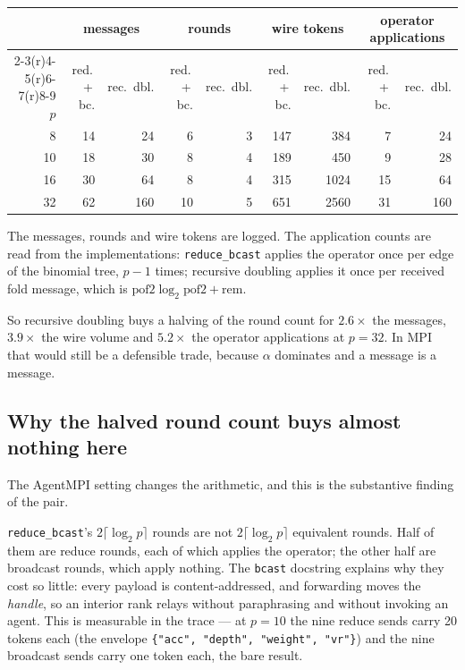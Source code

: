\documentclass[11pt]{article}
\begin{document}
\begin{center}\footnotesize
\begin{tabular}{@{}rrrrrrrrr@{}}
\toprule
  & \multicolumn{2}{c}{messages} & \multicolumn{2}{c}{rounds} & \multicolumn{2}{c}{wire tokens} & \multicolumn{2}{c}{operator applications} \\
  \cmidrule(r){2-3}\cmidrule(r){4-5}\cmidrule(r){6-7}\cmidrule(r){8-9}
  $p$ & red.\,+\,bc. & rec.\ dbl. & red.\,+\,bc. & rec.\ dbl. & red.\,+\,bc. & rec.\ dbl. & red.\,+\,bc. & rec.\ dbl. \\
\midrule
  8  & 14 & 24  & 6  & 3 & 147 & 384  & 7  & 24 \\
  10 & 18 & 30  & 8  & 4 & 189 & 450  & 9  & 28 \\
  16 & 30 & 64  & 8  & 4 & 315 & 1024 & 15 & 64 \\
  32 & 62 & 160 & 10 & 5 & 651 & 2560 & 31 & 160 \\
\bottomrule
\end{tabular}\normalsize
\end{center}

\noindent
The messages, rounds and wire tokens are logged. The application counts are read from the
implementations: \texttt{reduce\_bcast} applies the operator once per edge of the binomial tree,
$p-1$ times; recursive doubling applies it once per received fold message, which is
$\mathrm{pof2}\log_2\mathrm{pof2} + \mathrm{rem}$.

So recursive doubling buys a halving of the round count for $2.6\times$ the messages,
$3.9\times$ the wire volume and $5.2\times$ the operator applications at $p=32$. In MPI that
would still be a defensible trade, because $\alpha$ dominates and a message is a message.

\subsection{Why the halved round count buys almost nothing here}

The AgentMPI setting changes the arithmetic, and this is the substantive finding of the pair.

\texttt{reduce\_bcast}'s $2\lceil\log_2 p\rceil$ rounds are not $2\lceil\log_2 p\rceil$
equivalent rounds. Half of them are reduce rounds, each of which applies the operator; the other
half are broadcast rounds, which apply nothing. The \texttt{bcast} docstring explains why they
cost so little: every payload is content-addressed, and forwarding moves the \emph{handle}, so an
interior rank relays without paraphrasing and without invoking an agent. This is measurable in
the trace --- at $p=10$ the nine reduce sends carry 20 tokens each (the envelope
\texttt{\{"acc", "depth", "weight", "vr"\}}) and the nine broadcast sends carry one token each,
the bare result.
\end{document}
